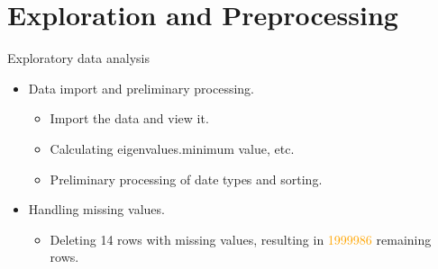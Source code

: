 \documentclass[
 size=14pt,
 paper=smartboard,  %
 mode=present, 		%
 display=slides, 	%
 style=tuliplab,  	%
 pauseslide,
 fleqn,leqno]{powerdot}
\begin{document}
\section{Exploration and Preprocessing}


\begin{slide}{Exploratory data analysis}
\begin{itemize}
\item
Data import and preliminary processing.


\begin{itemize}
  \item
  Import the data and view it.
  \item
  Calculating eigenvalues.minimum value, etc.
  \item
  Preliminary processing of date types and sorting.
\end{itemize}





\end{itemize}

\begin{itemize}
  \item
  Handling missing values.

  \begin{itemize}
    \item
    Deleting 14 rows with missing values, resulting in \textcolor{orange}{1999986} remaining rows.
  \end{itemize}
\end{itemize}


\end{slide}
\end{document}
